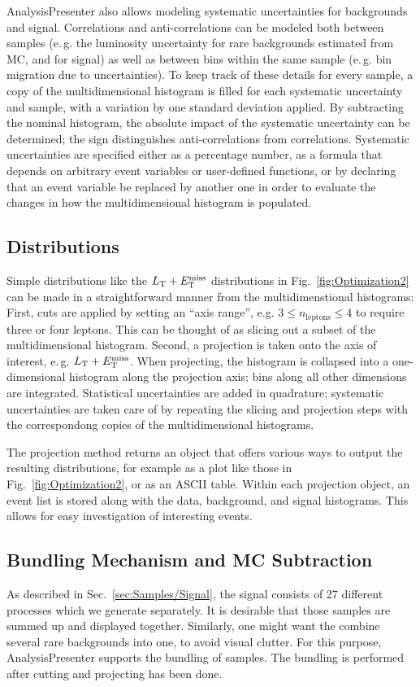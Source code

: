 AnalysisPresenter also allows modeling systematic uncertainties for backgrounds and signal. Correlations and anti-correlations can be modeled both between samples (e.\,g. the luminosity uncertainty for rare backgrounds estimated from MC, and for signal) as well as between bins within the same sample (e.\,g. bin migration due to \MET uncertainties). To keep track of these details for every sample, a copy of the multidimensional histogram is filled for each systematic uncertainty and sample, with a variation by one standard deviation applied. By subtracting the nominal histogram, the absolute impact of the systematic uncertainty can be determined; the sign distinguishes anti-correlations from correlations. Systematic uncertainties are specified either as a percentage number, as a formula that depends on arbitrary event variables or user-defined functions, or by declaring that an event variable be replaced by another one in order to evaluate the changes in how the multidimensional histogram is populated.

\subsection{Distributions}
Simple distributions like the $L_\textrm{T} + E_{\mathrm{T}}^{\text{miss}}$ distributions in Fig.~\ref{fig:Optimization2} can be made in a straightforward manner from the multidimenstional histograms: First, cuts are applied by setting an ``axis range'', e.g. $3 \leq n_\textrm{leptons} \leq 4$ to require three or four leptons. This can be thought of as slicing out a subset of the multidimensional histogram. Second, a projection is taken onto the axis of interest, e.\,g.  $L_\textrm{T} + E_{\mathrm{T}}^{\text{miss}}$. When projecting, the histogram is collapsed into a one-dimensional histogram along the projection axis; bins along all other dimensions are integrated. Statistical uncertainties are added in quadrature; systematic uncertainties are taken care of by repeating the slicing and projection steps with the correspondong copies of the multidimensional histograms.

The projection method returns an object that offers various ways to output the resulting distributions, for example as a plot like those in Fig.~\ref{fig:Optimization2}, or as an ASCII table. Within each projection object, an event list is stored along with the data, background, and signal histograms. This allows for easy investigation of interesting events.

\subsection{Bundling Mechanism and MC Subtraction}
As described in Sec.~\ref{sec:Samples/Signal}, the signal consists of 27 different processes which we generate separately. It is desirable that those samples are summed up and displayed together. Similarly, one might want the combine several rare backgrounds into one, to avoid visual clutter. For this purpose, AnalysisPresenter supports the bundling of samples. The bundling is performed after cutting and projecting has been done.

